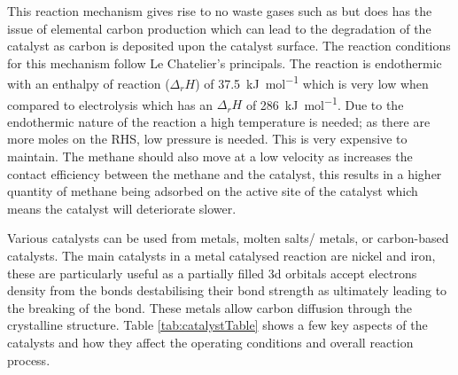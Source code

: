 This reaction mechanism gives rise to no waste gases such as  but does has the issue of elemental carbon production which can lead to the degradation of the catalyst as carbon is deposited upon the catalyst surface.
The reaction conditions for this mechanism follow Le Chatelier’s principals.
The reaction is endothermic with an enthalpy of reaction ($\Delta_{r}H$) of \SI{+37.5}{\kilo\joule\per\mole} which is very low when compared to electrolysis which has an $\Delta_{r}H$ of \SI{+286}{\kilo\joule\per\mole}\cite{sbn2020}.
Due to the endothermic nature of the reaction a high temperature is needed; as there are more moles on the RHS, low pressure is needed.
This is very expensive to maintain.
The methane should also move at a low velocity as increases the contact efficiency between the methane and the catalyst, this results in a higher quantity of methane being adsorbed on the active site of the catalyst which means the catalyst will deteriorate slower.

Various catalysts can be used from metals, molten salts/ metals, or carbon-based catalysts.
The main catalysts in a metal catalysed reaction are nickel and iron, these are particularly useful as a partially filled 3d orbitals accept electrons density from the  bonds destabilising their bond strength as ultimately leading to the breaking of the bond.
These metals allow carbon diffusion through the crystalline structure.
Table \ref{tab:catalystTable} shows a few key aspects of the catalysts and how they affect the operating conditions and overall reaction process.

